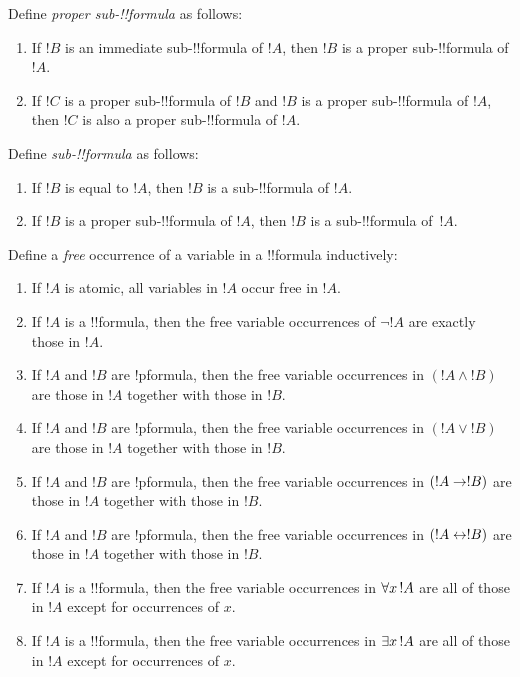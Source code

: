 \documentclass[open-logic-section]{subfiles}
\begin{document}
\begin{defn}
Define \emph{proper sub-!!{formula}} as follows:
\begin{enumerate}
\item If $!B$ is an immediate sub-!!{formula} of $!A$, then $!B$ is a
  proper sub-!!{formula} of $!A$.
\item If $!C$ is a proper sub-!!{formula} of $!B$ and $!B$ is a proper
  sub-!!{formula} of $!A$, then $!C$ is also a proper sub-!!{formula} of $!A$.
\end{enumerate}
\end{defn}

\begin{defn}
Define \emph{sub-!!{formula}} as follows:
\begin{enumerate}
\item If $!B$ is equal to $!A$, then $!B$ is a sub-!!{formula} of $!A$.
\item If $!B$ is a proper sub-!!{formula} of $!A$, then $!B$ is a
  sub-!!{formula} of~$!A$.
\end{enumerate}
\end{defn}


\begin{defn}
Define a \emph{free} occurrence of a variable in a !!{formula} inductively:
\begin{enumerate}
\item If $!A$ is atomic, all variables in $!A$ occur free in $!A$.
\item If $!A$ is a !!{formula}, then the free variable occurrences of
  $\lnot !A$ are exactly those in $!A$.
\item If $!A$ and $!B$ are !p{formula}, then the free variable
  occurrences in $(!A \land !B)$ are those in $!A$ together with those
  in $!B$.
\item If $!A$ and $!B$ are !p{formula}, then the free variable
  occurrences in $(!A \lor !B)$ are those in $!A$ together with those
  in $!B$.
\item If $!A$ and $!B$ are !p{formula}, then the free variable
  occurrences in $(!A \to !B)$ are those in $!A$ together with those
  in $!B$.
\item If $!A$ and $!B$ are !p{formula}, then the free variable
  occurrences in $(!A \leftrightarrow !B)$ are those in $!A$ together with those
  in $!B$.
\item If $!A$ is a !!{formula}, then the free variable occurrences in
  $\lforall[x][!A]$ are all of those in $!A$ except for occurrences of
  $x$.
\item If $!A$ is a !!{formula}, then the free variable occurrences in
  $\lexists[x][!A]$ are all of those in $!A$ except for occurrences of
  $x$.
\end{enumerate}
\end{defn}
\end{document}
